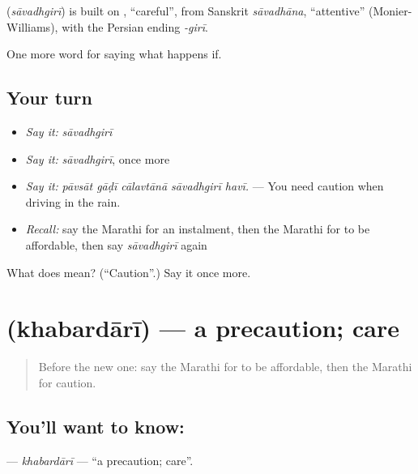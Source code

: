 \begin{cousinweb}
\textbf{} (\emph{sāvadhgirī}) is built on , \textquotedblleft{}careful\textquotedblright{}, from Sanskrit \emph{sāvadhāna}, \textquotedblleft{}attentive\textquotedblright{} (Monier-Williams), with the Persian ending \emph{-girī}.
\end{cousinweb}

\begin{grammarlens}[title={What you've built}]
One more word for saying what happens if.
\end{grammarlens}

\subsection*{Your turn}
\begin{itemize}
\raggedright
  \item \emph{Say it:} \emph{sāvadhgirī}
  \item \emph{Say it:} \emph{sāvadhgirī}, once more
  \item \emph{Say it:} \emph{pāvsāt gāḍī cālavtānā sāvadhgirī havī.} — You need caution when driving in the rain.
  \item \emph{Recall:} say the Marathi for an instalment, then the Marathi for to be affordable, then say \emph{sāvadhgirī} again
\end{itemize}

\begin{tcolorbox}[breakable,colback=teal!4,colframe=teal!35!black,title={Before you move on}]
What does  mean? (\textquotedblleft{}Caution\textquotedblright{}.) Say it once more.
\end{tcolorbox}
\section[\texorpdfstring{\mr{खबरदारी} (khabardārī)}{खबरदारी (khabardārī)}]{ (khabardārī) — a precaution; care}

\label{lesson:MR-C541-khabardari}



\begin{quote}
Before the new one: say the Marathi for to be affordable, then the Marathi for caution.
\end{quote}

\subsection*{You'll want to know: }
\textbf{} — \emph{khabardārī} — \textquotedblleft{}a precaution; care\textquotedblright{}.

